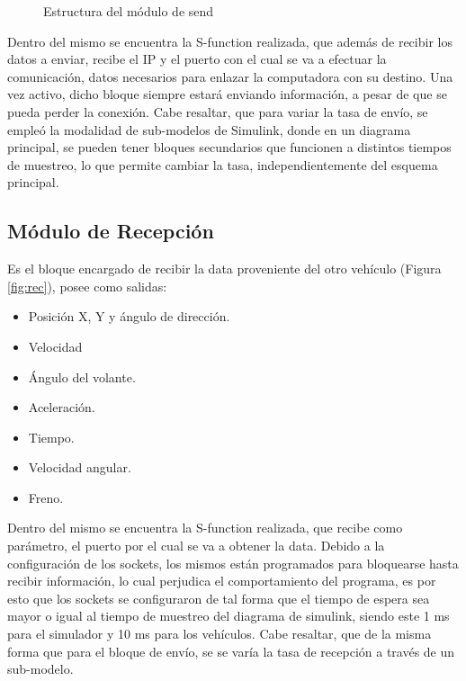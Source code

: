 \begin{figure}[!h]
 \caption{Estructura del módulo de send}
 \label{fig:send}
\end{figure}

\par Dentro del mismo se encuentra la S-function realizada, que además de recibir los datos a enviar, recibe el IP y el puerto con el cual se va a efectuar la comunicación, datos necesarios para enlazar la computadora con su destino. Una vez activo, dicho bloque siempre estará enviando información, a pesar de que se pueda perder la conexión. Cabe resaltar, que para variar la tasa de envío, se empleó la modalidad de sub-modelos de Simulink, donde en un diagrama principal, se pueden tener bloques secundarios que funcionen a distintos tiempos de muestreo, lo que permite cambiar la tasa, independientemente del esquema principal.          
\subsection{Módulo de Recepción}
Es el bloque encargado de recibir la data proveniente del otro vehículo (Figura \ref{fig:rec}), posee como salidas:

\begin{itemize}
\item Posición X, Y y ángulo de dirección.
\item Velocidad
\item Ángulo del volante.
\item Aceleración.
\item Tiempo.
\item Velocidad angular.
\item Freno.
\end{itemize}

\par Dentro del mismo se encuentra la S-function realizada, que recibe como parámetro, el puerto por el cual se va a obtener la data. Debido a la configuración de los sockets, los mismos están programados para bloquearse hasta recibir información, lo cual perjudica el comportamiento del programa, es por esto que los sockets se configuraron de tal forma que el tiempo de espera sea mayor o igual al tiempo de muestreo del diagrama de simulink, siendo este 1 ms para el simulador y 10 ms para los vehículos. Cabe resaltar, que de la misma forma que para el bloque de envío, se se varía la tasa de recepción a través de un sub-modelo.   

